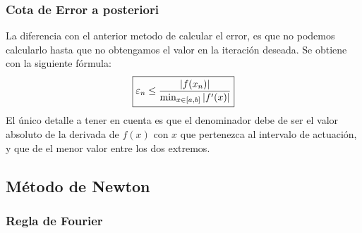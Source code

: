 \subsubsection{Cota de Error a posteriori}
\noindent La diferencia con el anterior metodo de calcular el error, es que no podemos calcularlo hasta que no obtengamos el valor en la iteración deseada. Se obtiene con la siguiente fórmula:
\[
        \boxed{\varepsilon_n \leq\frac{\left | f(x_n) \right |}{\textnormal{min}_{x \in [a,b]}\left | f'(x) \right |}}
\]
\noindent El único detalle a tener en cuenta es que el denominador debe de ser el valor absoluto de la derivada de \(f(x)\) con \(x\) que pertenezca al intervalo de actuación, y que de el menor valor entre los dos extremos.
\subsection{Método de Newton}
\subsubsection{Regla de Fourier}